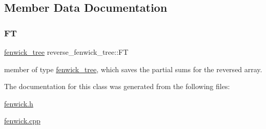 \subsection{Member Data Documentation}
\mbox{\label{classreverse__fenwick__tree_acde105967b3a3befc31e743807f7fd86}} 
\subsubsection{\texorpdfstring{FT}{FT}}
{\footnotesize\ttfamily \hyperlink{classfenwick__tree}{fenwick\+\_\+tree} reverse\+\_\+fenwick\+\_\+tree\+::\+FT\hspace{0.3cm}{\ttfamily [private]}}



member of type \hyperlink{classfenwick__tree}{fenwick\+\_\+tree}, which saves the partial sums for the reversed array. 



The documentation for this class was generated from the following files\+:\begin{DoxyCompactItemize}
\item 
\hyperlink{fenwick_8h}{fenwick.\+h}\item 
\hyperlink{fenwick_8cpp}{fenwick.\+cpp}\end{DoxyCompactItemize}
